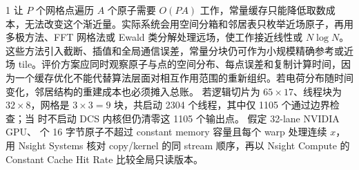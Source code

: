 \begin{solutionexercise}{1}
让 $P$ 个网格点遍历 $A$ 个原子需要 $O(PA)$ 工作，常量缓存只能降低取数成本，无法改变这个渐近量。实际系统会用空间分箱和邻居表只枚举近场原子，再用多极方法、FFT 网格法或 Ewald 类分解处理远场，使工作接近线性或 $N\log N$。这些方法引入截断、插值和全局通信误差，常量分块仍可作为小规模精确参考或近场 tile。评价方案应同时观察原子与点的空间分布、每点误差和复制计算时间，因为一个缓存优化不能代替算法层面对相互作用范围的重新组织。若电荷分布随时间变化，邻居结构的重建成本也必须摊入总账。
\variantheading 若逻辑切片为 $65\times17$、线程块为 $32\times8$，网格是 $3\times3=9$ 块，共启动 2304 个线程，其中仅 1105 个通过边界检查；当  时不启动 DCS 内核但仍清零这 1105 个输出点。
\practiceheading 假定 32-lane NVIDIA GPU、 个 16 字节原子不超过 constant memory 容量且每个 warp 处理连续 $x$，用 Nsight Systems 核对 copy/kernel 的同 stream 顺序，再以 Nsight Compute 的 Constant Cache Hit Rate 比较全局只读版本。
\end{solutionexercise}

